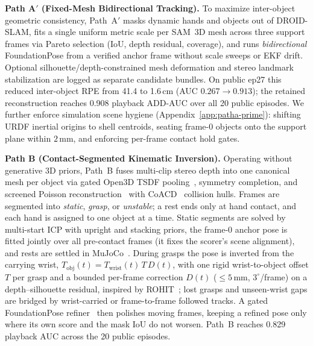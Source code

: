 \documentclass[10pt]{nvidiaextabstract}
\begin{document}
\textbf{Path A$'$ (Fixed-Mesh Bidirectional Tracking).} To maximize inter-object geometric consistency, Path~A$'$ masks dynamic hands and objects out of DROID-SLAM, fits a single uniform metric scale per SAM~3D mesh across three support frames via Pareto selection (IoU, depth residual, coverage), and runs \emph{bidirectional} FoundationPose from a verified anchor frame without scale sweeps or EKF drift. Optional silhouette/depth-constrained mesh deformation and stereo landmark stabilization are logged as separate candidate bundles. On public ep27 this reduced inter-object RPE from 41.4 to 1.6\,cm (AUC $0.267 \rightarrow 0.913$); the retained reconstruction reaches 0.908 playback ADD-AUC over all 20 public episodes. We further enforce simulation scene hygiene (Appendix~\ref{app:patha-prime}): shifting URDF inertial origins to shell centroids, seating frame-0 objects onto the support plane within $2$\,mm, and enforcing per-frame contact hold gates.

\textbf{Path B (Contact-Segmented Kinematic Inversion).} Operating without generative 3D priors, Path~B fuses multi-clip stereo depth into one canonical mesh per object via gated Open3D TSDF pooling~\cite{curless1996volumetric,zhou2018open3d}, symmetry completion, and screened Poisson reconstruction~\cite{kazhdan2013screened} with CoACD~\cite{wei2022coacd} collision hulls. Frames are segmented into \emph{static}, \emph{grasp}, or \emph{unstable}; a rest ends only at hand contact, and each hand is assigned to one object at a time. Static segments are solved by multi-start ICP with upright and stacking priors, the frame-0 anchor pose is fitted jointly over all pre-contact frames (it fixes the scorer's scene alignment), and rests are settled in MuJoCo~\cite{todorov2012mujoco}. During grasps the pose is inverted from the carrying wrist, $T_{\text{obj}}(t) = T_{\text{wrist}}(t)\,T\,D(t)$, with one rigid wrist-to-object offset $T$ per grasp and a bounded per-frame correction $D(t)$ ($\le 5$\,mm, $3^\circ$/frame) on a depth--silhouette residual, inspired by ROHIT~\cite{rohit}; lost grasps and unseen-wrist gaps are bridged by wrist-carried or frame-to-frame followed tracks. A gated FoundationPose refiner~\cite{wen2024foundationpose} then polishes moving frames, keeping a refined pose only where its own score and the mask IoU do not worsen. Path~B reaches 0.829 playback AUC across the 20 public episodes.
\end{document}
